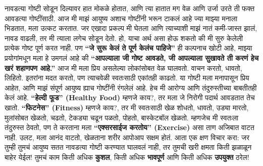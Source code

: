 नावडत्या गोष्टी सोडून दिल्यावर हात मोकळे होतात, आणि त्या हातात मग वेळ आणि उर्जा उरते ती फक्त आवडत्या गोष्टींसाठी. आज मी माझं आयुष्य अशाच गोष्टींनी भरून टाकलं आहे ज्या माझ्या मनाला भिडतात, मला उत्कट करतात. जर एखादा प्रकल्प मी घेतला आणि त्याच्याशी माझं नातं कमी-जास्त झालं, नावड वाढली, तर मी त्याला लगेच सोडून देतो. हो, याचा अर्थ असा होऊ शकतो की मी सुरु केलेली प्रत्येक गोष्ट पूर्ण करत नाही. पण \textbf{``जे सुरू केलं ते पूर्ण केलंच पाहिजे''} ही कल्पनाच खोटी आहे, माझ्या प्रयोगांमधून मला हे उमगलं आहे की \textbf{``आपल्याला जी गोष्ट आवडते, जी आपल्याला सुखावते ती करणं हेच खरं शहाणपण आहे.''}
आज मी मला प्रिय असलेल्या लोकांसोबत वेळ घालवतो. वाचन करतो, धावतो, लिहितो. इतरांना मदत करतो, पण त्याचवेळी स्वतःसाठी एकांतही काढतो. या गोष्टी मला मनापासून प्रिय आहेत, आणि माझं संपूर्ण आयुष्य ह्याच गोष्टींनी रंगलेलं आहे.
हेच मी आरोग्य आणि तंदुरुस्तीच्या बाबतीतही केलं आहे. \textbf{``हेल्दी फूड'' (Healthy Food)} म्हणजे काय?, तर मला जे निरोगी पदार्थ आवडतात तेच खातो. \textbf{``फिटनेस'' (Fitness)} म्हणजे काय?, तर मी स्वतःसाठी खेळ शोधतो, धावतो, उड्या मारतो, मुलांसोबत खेळतो, चढतो, टेकड्या चढून पळतो, पोहतो, बास्केटबॉल खेळतो. म्हणजेच मी स्वतःला तंदुरुस्त ठेवतो, पण ते करताना मला \textbf{``एक्सरसाईज करतोय'' (Exercise)} असा ताण अजिबात वाटत नाही. उलट, मला आनंद वाटतो, खेळताना शरीर आपोआप सक्षम होतं.
आता एक क्षण विचार करा: जर तुम्ही तुमचं आयुष्य सतत नावडत्या गोष्टी करण्यात घालवलं नाही, तर तुमची खरी क्षमता किती झळाळून बाहेर येईल! तुमचं काम किती अधिक \textbf{कुशल}, किती अधिक \textbf{भावपूर्ण} आणि किती अधिक \textbf{उपयुक्त} ठरेल!
